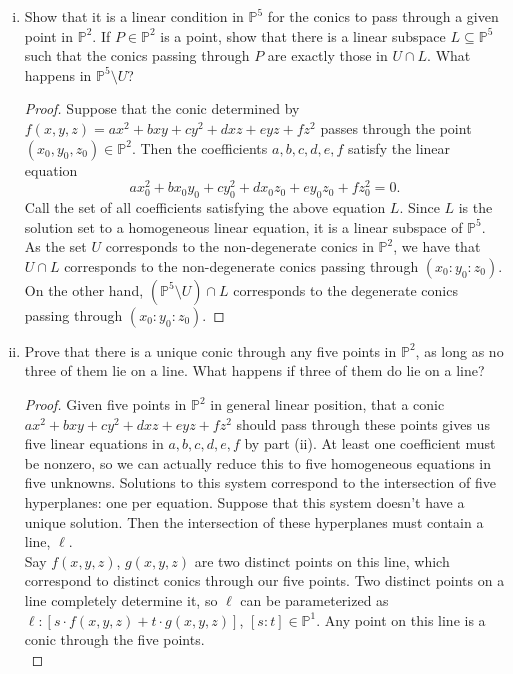 \documentclass[11pt,letterpaper]{report}
\newcommand{\proj}{\mathbb{P}}
\begin{document}
\begin{enumerate}[(i)]
\begin{proof}
		\noindent We have shown that our conic is non-degenerate if and only if the determinant of the matrix in (\ref{matrix}) is non-vanishing. The determinant is a polynomial in the in the coefficients $(a:b:c:d:e:f)\in \proj^5$, so the non-vanishing locus, and therefore the set of non-degenerate conics, corresponds to an open set in $\proj^5$.
	\end{proof}

	\item Show that it is a linear condition in $\proj^5$ for the conics to pass through a given point in $\proj^2$. If $P\in \proj^2$ is a point, show that there is a linear subspace $L\subseteq \proj^5$ such that the conics passing through $P$ are exactly those in $U\cap L$. What happens in $\proj^5\setminus U$?
	\begin{proof}
		Suppose that the conic determined by $f(x,y,z) = ax^2+bxy+cy^2 + dxz+eyz+fz^2$ passes through the point $(x_0, y_0, z_0)\in \proj^2$. Then the coefficients $a,b,c,d,e,f$ satisfy the linear equation
		\[
		ax_0^2+bx_0y_0+cy_0^2 + dx_0z_0+ey_0z_0+fz_0^2 = 0.
		\]
		Call the set of all coefficients satisfying the above equation $L$. Since $L$ is the solution set to a homogeneous linear equation, it is a linear subspace of $\proj^5$.
		As the set $U$ corresponds to the non-degenerate conics in $\proj^2$, we have that $U\cap L$ corresponds to the non-degenerate conics passing through $(x_0: y_0: z_0)$. On the other hand, $(\proj^5\setminus U)\cap L$ corresponds to the degenerate conics passing through $(x_0:y_0:z_0)$.
	\end{proof}

	\item Prove that there is a unique conic through any five points in $\proj^2$, as long as no three of them lie on a line. What happens if three of them do lie on a line?
	\begin{proof}
		Given five points in $\proj^2$ in general linear position, that a conic $ax^2+bxy+cy^2+dxz+eyz+fz^2$ should pass through these points gives us five linear equations in $a,b,c,d,e,f$ by part (ii). At least one coefficient must be nonzero, so we can actually reduce this to five homogeneous equations in five unknowns. Solutions to this system correspond to the intersection of five hyperplanes: one per equation. Suppose that this system doesn't have a unique solution. Then the intersection of these hyperplanes must contain a line, $\ell$.\\

		\noindent Say $f(x,y,z)$, $g(x,y,z)$ are two distinct points on this line, which correspond to distinct conics through our five points. Two distinct points on a line completely determine it, so $\ell$ can be parameterized as $\ell: [s\cdot f(x,y,z) + t\cdot g(x,y,z)]$, $[s:t]\in \proj^1$. Any point on this line is a conic through the five points.\\


\end{proof}
\end{enumerate}
\end{document}
